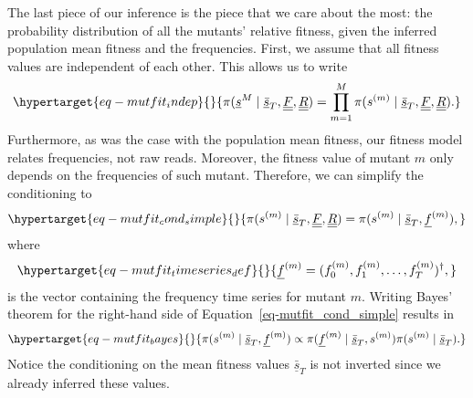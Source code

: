 \documentclass[
]{scrartcl}
\begin{document}
\begin{refsegment}
The last piece of our inference is the piece that we care about the
most: the probability distribution of all the mutants' relative fitness,
given the inferred population mean fitness and the frequencies. First,
we assume that all fitness values are independent of each other. This
allows us to write
\begin{equation}\protect\hypertarget{eq-mutfit_indep}{}{
\pi(
    \underline{s}^M \mid 
    \underline{\bar{s}}_T, \underline{\underline{F}}, \underline{\underline{R}}
) = 
\prod_{m=1}^M \pi(
    s^{(m)} \mid
    \underline{\bar{s}}_T, \underline{\underline{F}}, \underline{\underline{R}}
).
}\label{eq-mutfit_indep}\end{equation} Furthermore, as was the case with
the population mean fitness, our fitness model relates frequencies, not
raw reads. Moreover, the fitness value of mutant \(m\) only depends on
the frequencies of such mutant. Therefore, we can simplify the
conditioning to
\begin{equation}\protect\hypertarget{eq-mutfit_cond_simple}{}{
\pi(
    s^{(m)} \mid
    \underline{\bar{s}}_T, \underline{\underline{F}}, \underline{\underline{R}}
) = 
\pi(s^{(m)} \mid \underline{\bar{s}}_T, \underline{f}^{(m)}),
}\label{eq-mutfit_cond_simple}\end{equation} where
\begin{equation}\protect\hypertarget{eq-mutfit_timeseries_def}{}{
\underline{f}^{(m)} = (f_0^{(m)}, f_1^{(m)}, \ldots, f_T^{(m)})^\dagger,
}\label{eq-mutfit_timeseries_def}\end{equation} is the vector containing
the frequency time series for mutant \(m\). Writing Bayes' theorem for
the right-hand side of Equation~\ref{eq-mutfit_cond_simple} results in
\begin{equation}\protect\hypertarget{eq-mutfit_bayes}{}{
\pi(s^{(m)} \mid \underline{\bar{s}}_T, \underline{f}^{(m)}) \propto
\pi(\underline{f}^{(m)} \mid \underline{\bar{s}}_T, s^{(m)})
\pi(s^{(m)} \mid \underline{\bar{s}}_T).
}\label{eq-mutfit_bayes}\end{equation} Notice the conditioning on the
mean fitness values \(\underline{\bar{s}}_T\) is not inverted since we
already inferred these values.


\end{refsegment}
\end{document}
